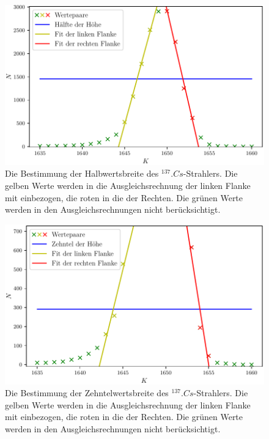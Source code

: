 \begin{figure}
	\centering
	\includegraphics[width=\linewidth-60pt,height=\textheight-60pt,keepaspectratio]{content/images/Cs137Halb.pdf}
	\caption{Die Bestimmung der Halbwertsbreite des $^{137}.{Cs}$-Strahlers. Die gelben Werte werden in die Ausgleichsrechnung der linken Flanke mit einbezogen, die roten in die der Rechten. Die grünen Werte werden in den Ausgleichsrechnungen nicht berücksichtigt.}
	\label{fig:2tel}
\end{figure}

\begin{figure}
	\centering
	\includegraphics[width=\linewidth-60pt,height=\textheight-60pt,keepaspectratio]{content/images/Cs137Zehntel.pdf}
	\caption{Die Bestimmung der Zehntelwertsbreite des $^{137}.{Cs}$-Strahlers. Die gelben Werte werden in die Ausgleichsrechnung der linken Flanke mit einbezogen, die roten in die der Rechten. Die grünen Werte werden in den Ausgleichsrechnungen nicht berücksichtigt.}
	\label{fig:10tel}
\end{figure}

